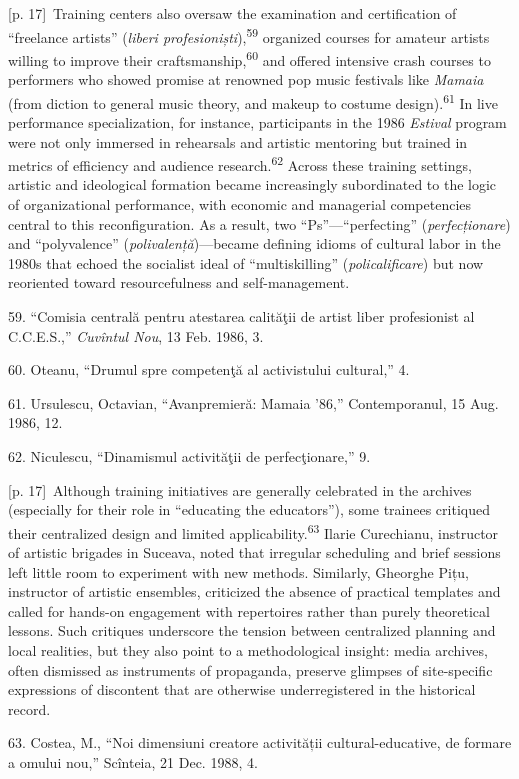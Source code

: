 \documentclass[10pt,a4paper]{article}
\begin{document}
{\scriptsize\color{gray} [p. 17]}\ Training centers also oversaw the examination and certification of “freelance artists” (\textit{liberi profesioniști}),\nobreak\textsuperscript{59} organized courses for amateur artists willing to improve their craftsmanship,\nobreak\textsuperscript{60} and offered intensive crash courses to performers who showed promise at renowned pop music festivals like \textit{Mamaia} (from diction to general music theory, and makeup to costume design).\nobreak\textsuperscript{61} In live performance specialization, for instance, participants in the 1986 \textit{Estival} program were not only immersed in rehearsals and artistic mentoring but trained in metrics of efficiency and audience research.\nobreak\textsuperscript{62} Across these training settings, artistic and ideological formation became increasingly subordinated to the logic of organizational performance, with economic and managerial competencies central to this reconfiguration. As a result, two “Ps”—“perfecting” (\textit{perfecționare}) and “polyvalence” (\textit{polivalență})—became defining idioms of cultural labor in the 1980s that echoed the socialist ideal of “multiskilling” (\textit{policalificare}) but now reoriented toward resourcefulness and self-management.\par{\small 59. “Comisia centrală pentru atestarea calităţii de artist liber profesionist al C.C.E.S.,” \textit{Cuvîntul Nou}, 13 Feb. 1986, 3.\par}{\small 60. Oteanu, “Drumul spre competenţă al activistului cultural,” 4.\par}{\small 61. Ursulescu, Octavian, “Avanpremieră: Mamaia ’86,” Contemporanul, 15 Aug. 1986, 12.\par}{\small 62. Niculescu, “Dinamismul activităţii de perfecţionare,” 9.\par}
{\scriptsize\color{gray} [p. 17]}\ Although training initiatives are generally celebrated in the archives (especially for their role in “educating the educators”), some trainees critiqued their centralized design and limited applicability.\nobreak\textsuperscript{63} Ilarie Curechianu, instructor of artistic brigades in Suceava, noted that irregular scheduling and brief sessions left little room to experiment with new methods. Similarly, Gheorghe Pițu, instructor of artistic ensembles, criticized the absence of practical templates and called for hands-on engagement with repertoires rather than purely theoretical lessons. Such critiques underscore the tension between centralized planning and local realities, but they also point to a methodological insight: media archives, often dismissed as instruments of propaganda, preserve glimpses of site-specific expressions of discontent that are otherwise underregistered in the historical record.\par{\small 63. Costea, M., “Noi dimensiuni creatore activității cultural-educative, de formare a omului nou,” Scînteia, 21 Dec. 1988, 4.\par}
\end{document}
